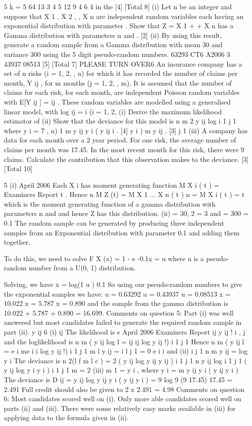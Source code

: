 \documentclass[a4paper,12pt]{article}
\begin{document}
5
k = 5
64%
13%
3%
4%
5%
12%
9%
4%
6%
4%
in the
[4]
[Total 8]
(i) Let n be an integer and suppose that X 1 , X 2 , , X n are independent random
variables each having an exponential distribution with parameter . Show that
Z = X 1 + + X n has a Gamma distribution with parameters n and .
[2]
(ii) By using this result, generate a random sample from a Gamma distribution
with mean 30 and variance 300 using the 5 digit pseudo-random numbers.
63293
CT6 A2006 3
43937
08513
[5]
[Total 7]
PLEASE TURN OVER6
An insurance company has a set of n risks (i = 1, 2, , n) for which it has recorded
the number of claims per month, Y ij , for m months (j = 1, 2, , m).
It is assumed that the number of claims for each risk, for each month, are independent
Poisson random variables with
E[Y ij ] =
ij .
These random variables are modelled using a generalised linear model, with
log
ij
=
i
(i = 1, 2,
(i) Derive the maximum likelihood estimator of (ii) Show that the deviance for this model is
n
m
2
y ij log
i 1 j 1
where y i =
7
, n)
1
m
y ij
y i
( y ij
i .
[4]
y i )
m
y ij .
[3]
j 1
(iii) A company has data for each month over a 2 year period. For one risk, the
average number of claims per month was 17.45. In the most recent month for
this risk, there were 9 claims. Calculate the contribution that this observation
makes to the deviance.
[3]
[Total 10]


5
(i)
April 2006
Each X i has moment generating function M X i ( t ) =
Examiners Report
t
. Hence
n
M Z (t) = M X 1
... X n ( t )
n
= M X i ( t ) =
t
which is the moment generating function of a gamma distribution with parameters n and and hence Z has this distribution.
(ii)
= 30,
2
= 3 and
= 300
= 0.1
The random sample can be generated by producing three independent samples from an Exponential distribution with parameter 0.1 and adding them together.

To do this, we need to solve
F X (x) = 1 - e -0.1x = u
where u is a pseudo-random number from a U(0, 1) distribution.

Solving, we have x =
log(1 u )
0.1
So using our pseudo-random numbers to give the exponential samples we have:
u = 0.63292
u = 0.43937
u = 0.08513
x = 10.022
x = 5.787
x = 0.890
and the sample from the gamma distribution is
10.022 + 5.787 + 0.890 = 16.699.
Comments on question 5: Part (i) was well answered but most candidates failed to generate
the required random sample in part (ii).
y ij
6
(i)
ij
The likelihood is
e
April 2006
Examiners Report
ij
y ij !
i , j
and the loglikelihood is
n
m
( y ij log
l =
ij
ij
log y ij !)
i 1 j 1
Hence
n
m
( y ij
l =
e i
me i
i
log y ij !)
i 1 j 1
m
l
y ij
=
i
l
j 1
= 0
e
i
i
and
(ii)
i
j 1
n m
y ij
= log y i
The deviance is
n
2(l f
m
l c ) = 2
( y ij log y ij
y ij )
i 1 j 1
n
y ij log
i 1 j 1
( y ij log y i
y i )
i 1 j 1
m
= 2
(iii)
m
1
= y i , where y i =
m
y ij
y i
( y ij
y i )
The deviance is
D ij = y ij log
y ij
y i
( y ij
y i ) = 9 log
9
(9 17.45)
17.45
= 2.491
Full credit should also be given to 2 x 2.491 = 4.98
Comments on question 6: Most candidates scored well on (i). Only more able candidates
scored well on parts (ii) and (iii). There were some relatively easy marks available in (iii) for
applying data to the formula given in (ii).
\end{document}
